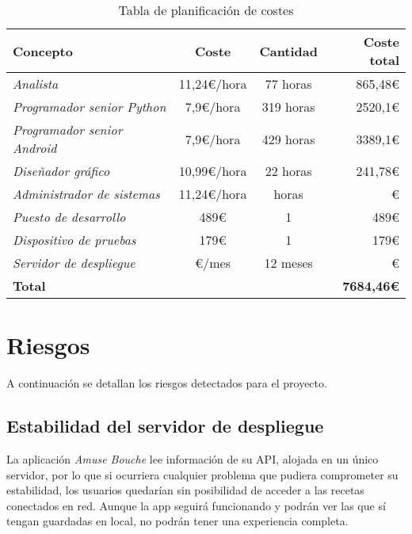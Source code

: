 \begin{table}[hbtp]
  \centering
  \begin{tabular}[h]{|l|c|c|r|}
    \hline
    \textbf{Concepto} & \textbf{Coste} & \textbf{Cantidad} & \textbf{Coste total} \\
    \hline
    \textit{Analista} & 11,24€/hora & 77 horas & 865,48€ \\
    \hline
    \textit{Programador senior Python} & 7,9€/hora & 319 horas & 2520,1€ \\
    \hline
    \textit{Programador senior Android} & 7,9€/hora & 429 horas & 3389,1€ \\
    \hline
    \textit{Diseñador gráfico} & 10,99€/hora & 22 horas & 241,78€ \\
    \hline
    \textit{Administrador de sistemas} & 11,24€/hora &  horas & € \\
    \hline
    \textit{Puesto de desarrollo} & 489€ & 1 & 489€ \\
    \hline
    \textit{Dispositivo de pruebas} & 179€ & 1 & 179€ \\
    \hline
    \textit{Servidor de despliegue} & €/mes & 12 meses & € \\
    \hline
    \textbf{Total} & \multicolumn{3}{r|}{\textbf{7684,46€}} \\
    \hline
  \end{tabular}
  \caption{Tabla de planificación de costes}
  \label{tab:costes}
\end{table}

\section{Riesgos}
\label{sec:riesgos}


A continuación se detallan los riesgos detectados para el proyecto.

\subsection{Estabilidad del servidor de despliegue}
\label{subsec:estabilidad-servidor}

La aplicación \textit{Amuse Bouche} lee información de su API, alojada en un
único servidor, por lo que si ocurriera cualquier problema que pudiera
comprometer su estabilidad, los usuarios quedarían sin posibilidad de acceder a
las recetas conectados en red. Aunque la app seguirá funcionando y podrán ver
las que sí tengan guardadas en local, no podrán tener una experiencia completa.

